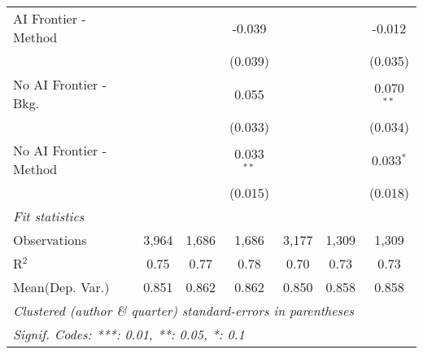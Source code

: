 \begin{tabular}{lcccccc}
   AI Frontier - Method    &         &             & -0.039       &         &         & -0.012\\   
                           &         &             & (0.039)      &         &         & (0.035)\\   
   No AI Frontier - Bkg.   &         &             & 0.055        &         &         & 0.070$^{**}$\\   
                           &         &             & (0.033)      &         &         & (0.034)\\   
   No AI Frontier - Method &         &             & 0.033$^{**}$ &         &         & 0.033$^{*}$\\   
                           &         &             & (0.015)      &         &         & (0.018)\\   
   \midrule
   \emph{Fit statistics}\\
   Observations            & 3,964   & 1,686       & 1,686        & 3,177   & 1,309   & 1,309\\  
   R$^2$                   & 0.75    & 0.77        & 0.78         & 0.70    & 0.73    & 0.73\\  
Mean(Dep. Var.) & 0.851 & 0.862 & 0.862 & 0.850 & 0.858 & 0.858 \\
   \midrule \midrule
   \multicolumn{7}{l}{\emph{Clustered (author \& quarter) standard-errors in parentheses}}\\
   \multicolumn{7}{l}{\emph{Signif. Codes: ***: 0.01, **: 0.05, *: 0.1}}\\
\end{tabular}
\par\endgroup
